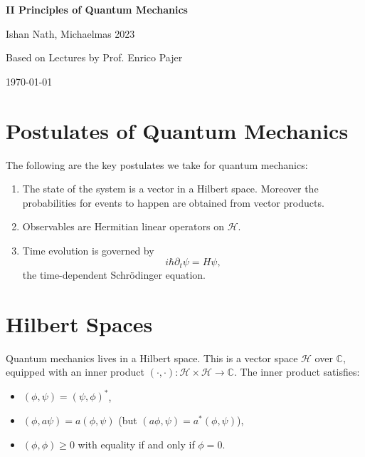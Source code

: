 \documentclass[12pt]{article}
\begin{document}
\hypersetup{pageanchor=false}
\begin{titlepage}
	\begin{center}
		\vspace*{1em}
		\Huge
		\textbf{II Principles of Quantum Mechanics}

		\vspace{1em}
		\large
		Ishan Nath, Michaelmas 2023

		\vspace{1.5em}

		\Large

		Based on Lectures by Prof. Enrico Pajer

		\vspace{1em}

		\large
		\today
	\end{center}
	
\end{titlepage}
\hypersetup{pageanchor=true}
\setcounter{tocdepth}{2}

\tableofcontents

\newpage


\setcounter{section}{-1}

\section{Postulates of Quantum Mechanics}
\label{sec:postulates}

The following are the key postulates we take for quantum mechanics:
\begin{enumerate}[label = Postulate \Roman*.]
	\item The state of the system is a vector in a Hilbert space. Moreover the probabilities for events to happen are obtained from vector products.
	\item Observables are Hermitian linear operators on $\mathcal{H}$.
	\item Time evolution is governed by
		\[
		i \hbar \partial_t \psi = H\psi,
		\]
		the time-dependent Schr\"{o}dinger equation.
\end{enumerate}

\newpage

\section{Hilbert Spaces}
\label{sec:hilbert_spaces}

Quantum mechanics lives in a Hilbert space. This is a vector space $\mathcal{H}$ over $\mathbb{C}$, equipped with an inner product $(\cdot, \cdot) : \mathcal{H} \times \mathcal{H} \to \mathbb{C}$. The inner product satisfies:
\begin{itemize}
	\item $(\phi, \psi) = (\psi, \phi)^{\ast}$,
	\item $(\phi, a\psi) = a (\phi, \psi)$ (but $(a \phi, \psi) = a^{\ast} (\phi, \psi)$),
	\item $(\phi, \phi) \geq 0$ with equality if and only if $\phi = 0$.
\end{itemize}
\end{document}
